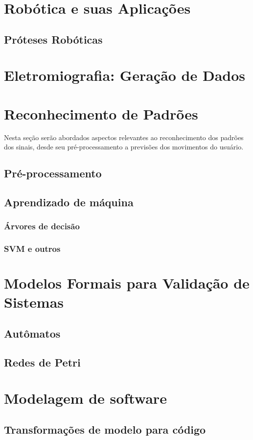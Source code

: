 \section{Robótica e suas Aplicações}
\label{sec:robotica}
\subsection{Próteses Robóticas}

\section{Eletromiografia: Geração de Dados}
\label{sec:emg}

\section{Reconhecimento de Padrões}
\label{patternrec}
Nesta seção serão abordados aspectos relevantes ao reconhecimento dos padrões dos sinais, desde seu pré-processamento a previsões dos movimentos do usuário.
\subsection{Pré-processamento}
\subsection{Aprendizado de máquina}
\subsubsection{Árvores de decisão}
\subsubsection{SVM e outros}


\section{Modelos Formais para Validação de Sistemas}
\label{sec:modelosformais}
\subsection{Autômatos}
\subsection{Redes de Petri}

\section{Modelagem de software}
\label{sec:modelagem}
\subsection{Transformações de modelo para código}